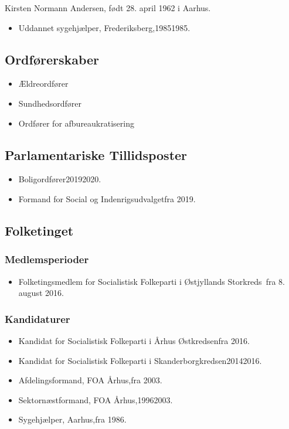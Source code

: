 \documentclass[11pt, a4paper]{awesome-cv}
\begin{document}
\makecvheader[R]
\makelettertitle
\begin{cvletter}
Kirsten Normann Andersen, født 28. april 1962 i Aarhus.

\begin{itemize}
\item Uddannet sygehjælper, Frederiksberg,19851985.
\end{itemize}
\subsection*{Ordførerskaber}
\begin{itemize}
\item Ældreordfører
\item Sundhedsordfører
\item Ordfører for afbureaukratisering
\end{itemize}
\subsection*{Parlamentariske Tillidsposter}
\begin{itemize}
\item Boligordfører20192020.
\item Formand for Social og Indenrigsudvalgetfra 2019.
\end{itemize}
\subsection*{Folketinget}
\subsubsection*{Medlemsperioder}
\begin{itemize}
\item Folketingsmedlem for Socialistisk Folkeparti i Østjyllands Storkreds fra 8. august 2016.
\end{itemize}
\subsubsection*{Kandidaturer}
\begin{itemize}
\item Kandidat for Socialistisk Folkeparti i Århus Østkredsenfra 2016.
\item Kandidat for Socialistisk Folkeparti i Skanderborgkredsen20142016.
\end{itemize}
\begin{itemize}
\item Afdelingsformand, FOA Århus,fra 2003.
\item Sektornæstformand, FOA Århus,19962003.
\item Sygehjælper, Aarhus,fra 1986.
\end{itemize}
\end{cvletter}
\end{document}
